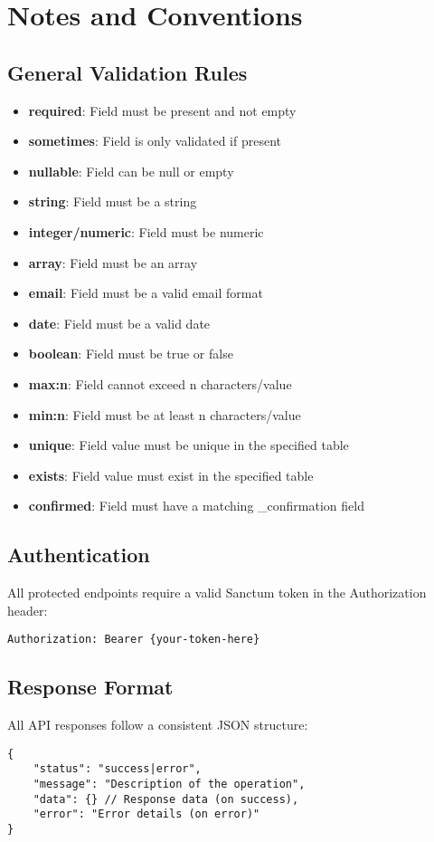 \documentclass[12pt,a4paper]{article}
\begin{document}
\section{Notes and Conventions}

\subsection{General Validation Rules}
\begin{itemize}
    \item \textbf{required}: Field must be present and not empty
    \item \textbf{sometimes}: Field is only validated if present
    \item \textbf{nullable}: Field can be null or empty
    \item \textbf{string}: Field must be a string
    \item \textbf{integer/numeric}: Field must be numeric
    \item \textbf{array}: Field must be an array
    \item \textbf{email}: Field must be a valid email format
    \item \textbf{date}: Field must be a valid date
    \item \textbf{boolean}: Field must be true or false
    \item \textbf{max:n}: Field cannot exceed n characters/value
    \item \textbf{min:n}: Field must be at least n characters/value
    \item \textbf{unique}: Field value must be unique in the specified table
    \item \textbf{exists}: Field value must exist in the specified table
    \item \textbf{confirmed}: Field must have a matching \_confirmation field
\end{itemize}

\subsection{Authentication}
All protected endpoints require a valid Sanctum token in the Authorization header:
\begin{verbatim}
Authorization: Bearer {your-token-here}
\end{verbatim}

\subsection{Response Format}
All API responses follow a consistent JSON structure:
\begin{lstlisting}[caption=Standard Response Format]
{
    "status": "success|error",
    "message": "Description of the operation",
    "data": {} // Response data (on success),
    "error": "Error details (on error)"
}
\end{lstlisting}
\end{document}
